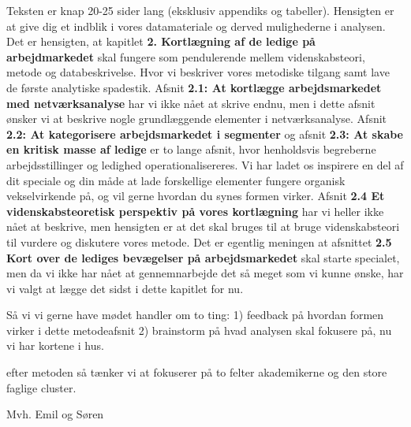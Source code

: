 Teksten er knap 20-25 sider lang (eksklusiv appendiks og tabeller). Hensigten er at give dig et indblik i vores datamateriale og derved mulighederne i analysen. Det er hensigten, at kapitlet \textbf{2. Kortlægning af de ledige på arbejdmarkedet} skal fungere som pendulerende mellem videnskabsteori, metode og databeskrivelse. Hvor vi beskriver vores metodiske tilgang samt lave de første analytiske spadestik. Afsnit \textbf{2.1: At kortlægge arbejdsmarkedet med netværksanalyse} har vi ikke nået at skrive endnu, men i dette afsnit ønsker vi at beskrive nogle grundlæggende elementer i netværksanalyse. Afsnit \textbf{2.2: At kategorisere arbejdsmarkedet i segmenter} og afsnit \textbf{2.3: At skabe en kritisk masse af ledige} er to lange afsnit, hvor henholdsvis begreberne arbejdsstillinger og ledighed operationalisereres. Vi har ladet os inspirere en del af dit speciale og din måde at lade forskellige elementer fungere organisk vekselvirkende på, og vil gerne hvordan du synes formen virker. Afsnit \textbf{2.4 Et videnskabsteoretisk perspektiv på vores kortlægning} har vi heller ikke nået at beskrive, men hensigten er at det skal bruges til at bruge videnskabsteori til vurdere og diskutere vores metode. Det er egentlig meningen at afsnittet \textbf{2.5 Kort over de lediges bevægelser på arbejdsmarkedet} skal starte specialet, men da vi ikke har nået at gennemnarbejde det så meget som vi kunne ønske, har vi valgt at lægge det sidst i dette kapitlet for nu.

Så vi vi gerne have mødet handler om to ting: 1) feedback på hvordan formen virker i dette metodeafsnit 2) brainstorm på hvad analysen skal fokusere på, nu vi har kortene i hus.

efter metoden så tænker vi at fokuserer på to felter akademikerne og den store faglige cluster.

Mvh.
Emil og Søren


